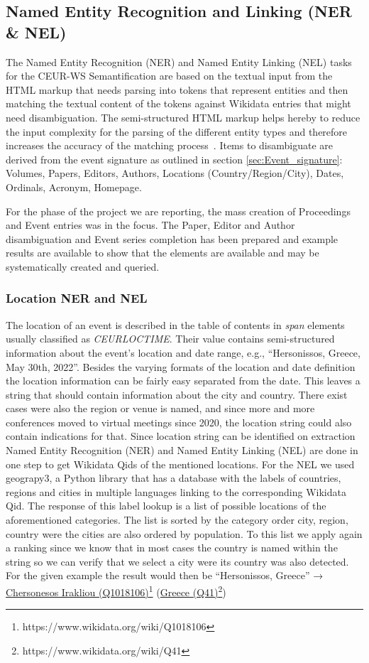 \documentclass[]{ceurart}
\newcommand{\tquote}[1]{``#1''}
\newcommand{\footnotelink}[2]{\href{#1}{#2}\footnote{#1}}
\newcommand{\wdq}[2]{\footnotelink{https://www.wikidata.org/wiki/#2}{#1 (#2)}}
\begin{document}
\subsection{Named Entity Recognition and Linking (NER \& NEL)}
The Named Entity Recognition (NER) and Named Entity Linking (NEL) tasks for the CEUR-WS Semantification are based on the textual input from the HTML markup that needs parsing into tokens that represent entities and then matching the textual content of the tokens against Wikidata entries that might need disambiguation. 
The semi-structured HTML markup helps hereby to reduce the input complexity for the parsing of the different entity types and therefore increases the accuracy of the matching process~\cite{COCHINWALA20011}.
Items to disambiguate are derived from the event signature as outlined in section \ref{sec:Event_signature}: Volumes, Papers, Editors, Authors, Locations (Country/Region/City), Dates, Ordinals, Acronym, Homepage.

For the phase of the project we are reporting, the mass creation of Proceedings and Event entries was in the focus. The Paper, Editor and Author disambiguation and Event series completion has been prepared and example results are available to show that the elements are available and may be systematically created and queried.
\subsubsection{Location NER and NEL}
The location of an event is described in the table of contents in \textit{span} elements usually classified as \textit{CEURLOCTIME}.
Their value contains semi-structured information about the event's location and date range, e.g., \tquote{Hersonissos, Greece, May 30th, 2022}.
Besides the varying formats of the location and date definition the location information can be fairly easy separated from the date.
This leaves a string that should contain information about the city and country.
There exist cases were also the region or venue is named, and since more and more conferences moved to virtual meetings since 2020, the location string could also contain indications for that.
Since location string can be identified on extraction Named Entity Recognition (NER) and Named Entity Linking (NEL) are done in one step to get Wikidata Qids of the mentioned locations.
For the NEL we used geograpy3, a Python library that has a database with the labels of countries, regions and cities in multiple languages linking to the corresponding Wikidata Qid.
The response of this label lookup is a list of possible locations of the aforementioned categories.
The list is sorted by the category order city, region, country were the cities are also ordered by population.
To this list we apply again a ranking since we know that in most cases the country is named within the string so we can verify that we select a city were its country was also detected.
For the given example the result would then be \tquote{Hersonissos, Greece} → \wdq{Chersonesos Irakliou}{Q1018106} (\wdq{Greece}{Q41})
\end{document}
